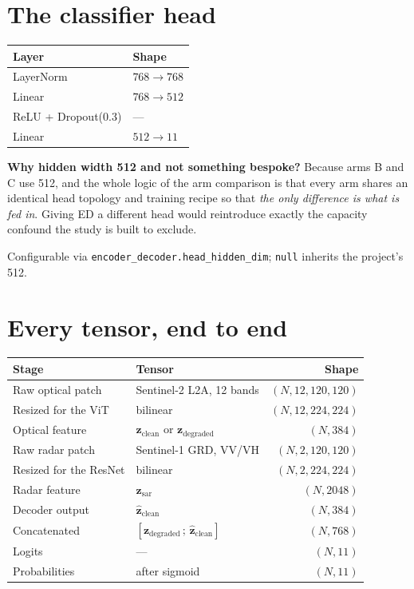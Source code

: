 \documentclass[11pt,a4paper]{report}
\newcommand{\code}[1]{\texttt{\small #1}}
\newcommand{\zc}{\mathbf{z}_{\text{clean}}}
\newcommand{\zd}{\mathbf{z}_{\text{degraded}}}
\newcommand{\zs}{\mathbf{z}_{\text{sar}}}
\newcommand{\zh}{\hat{\mathbf{z}}_{\text{clean}}}
\begin{document}
\section{The classifier head}

\begin{center}
\small
\begin{tabular}{@{}ll@{}}
\toprule
\textbf{Layer} & \textbf{Shape} \\
\midrule
LayerNorm & $768 \rightarrow 768$ \\
Linear & $768 \rightarrow 512$ \\
ReLU + Dropout(0.3) & --- \\
Linear & $512 \rightarrow 11$ \\
\bottomrule
\end{tabular}
\end{center}

\begin{whybox}
\textbf{Why hidden width 512 and not something bespoke?} Because arms B and C use
512, and the whole logic of the arm comparison is that every arm shares an
identical head topology and training recipe so that \emph{the only difference is
what is fed in}. Giving ED a different head would reintroduce exactly the
capacity confound the study is built to exclude.

\medskip
Configurable via \code{encoder\_decoder.head\_hidden\_dim}; \code{null} inherits the
project's 512.
\end{whybox}

\section{Every tensor, end to end}

\begin{center}
\small
\begin{tabular}{@{}llr@{}}
\toprule
\textbf{Stage} & \textbf{Tensor} & \textbf{Shape} \\
\midrule
Raw optical patch & Sentinel-2 L2A, 12 bands & $(N, 12, 120, 120)$ \\
Resized for the ViT & bilinear & $(N, 12, 224, 224)$ \\
Optical feature & $\zc$ or $\zd$ & $(N, 384)$ \\
\midrule
Raw radar patch & Sentinel-1 GRD, VV/VH & $(N, 2, 120, 120)$ \\
Resized for the ResNet & bilinear & $(N, 2, 224, 224)$ \\
Radar feature & $\zs$ & $(N, 2048)$ \\
\midrule
Decoder output & $\zh$ & $(N, 384)$ \\
Concatenated & $[\zd\,;\,\zh]$ & $(N, 768)$ \\
Logits & --- & $(N, 11)$ \\
Probabilities & after sigmoid & $(N, 11)$ \\
\bottomrule
\end{tabular}
\end{center}
\end{document}
